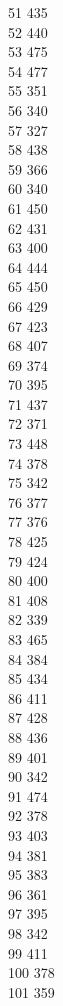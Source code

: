 { 51	435 \\
 52	440 \\
 53	475 \\
 54	477 \\
 55	351 \\
 56	340 \\
 57	327 \\
 58	438 \\
 59	366 \\
 60	340 \\
 61	450 \\
 62	431 \\
 63	400 \\
 64	444 \\
 65	450 \\
 66	429 \\
 67	423 \\
 68	407 \\
 69	374 \\
 70	395 \\
 71	437 \\
 72	371 \\
 73	448 \\
 74	378 \\
 75	342 \\
 76	377 \\
 77	376 \\
 78	425 \\
 79	424 \\
 80	400 \\
 81	408 \\
 82	339 \\
 83	465 \\
 84	384 \\
 85	434 \\
 86	411 \\
 87	428 \\
 88	436 \\
 89	401 \\
 90	342 \\
 91	474 \\
 92	378 \\
 93	403 \\
 94	381 \\
 95	383 \\
 96	361 \\
 97	395 \\
 98	342 \\
 99	411 \\
 100	378 \\
 101	359 \\
}
